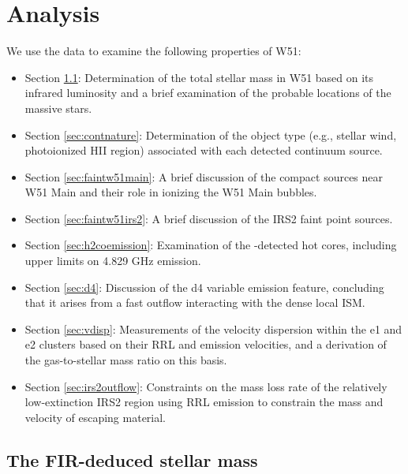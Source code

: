 \section{Analysis}
\label{sec:analysis}
We use the data to examine the following properties of W51:
\begin{itemize}
    \item Section \ref{sec:stellarmass}: Determination of the total stellar
        mass in W51 based on its infrared luminosity and a brief examination
        of the probable locations of the massive stars.
    \item Section \ref{sec:contnature}: Determination of the object type
        (e.g., stellar wind, photoionized HII region) associated with each
        detected continuum source.
    \item Section \ref{sec:faintw51main}: A brief discussion of the compact
        sources near W51 Main and their role in ionizing the W51 Main bubbles.
    \item Section \ref{sec:faintw51irs2}: A brief discussion of the IRS2 faint
        point sources.
    \item Section \ref{sec:h2coemission}: Examination of the \ortho
        \twotwo-detected hot cores, including upper limits on 4.829 GHz \ortho
        \oneone emission.
    \item Section \ref{sec:d4}: Discussion of the d4 variable emission
        feature, concluding that it arises from a fast outflow interacting with
        the dense local ISM.
    \item Section \ref{sec:vdisp}: Measurements of the velocity dispersion
        within the e1 and e2 clusters based on their RRL and \formaldehyde
        emission velocities, and a derivation of the gas-to-stellar mass ratio
        on this basis.
    \item Section \ref{sec:irs2outflow}: Constraints on the mass loss rate of the
        relatively low-extinction IRS2 region using RRL emission to constrain
        the mass and velocity of escaping material.
\end{itemize}

\subsection{The FIR-deduced stellar mass}
\label{sec:stellarmass}

